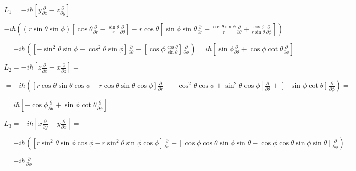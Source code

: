 \begin{equation}
  \begin{array}{c}
    L_1 = -i\hbar\left[y\frac{\partial}{\partial z}-z\frac{\partial}{\partial y}\right] =
    \\

    \\
    -i\hbar\left((r\sin{\theta}\sin{\phi})\left[\cos{\theta}\frac{\partial}{\partial r} - \frac{\sin{\theta}}{r} \frac{\partial}{\partial \theta}\right]-r\cos{\theta}\left[\sin{\phi}\sin{\theta}\frac{\partial}{\partial r} + \frac{\cos{\theta}\sin{\phi}}{r} \frac{\partial}{\partial \theta} + \frac{\cos{\phi}}{r\sin{\theta}} \frac{\partial}{\partial \phi}\right]\right) =
    \\

    \\
    = -i\hbar\left(\left[-\sin^2\theta\sin\phi-\cos^2\theta\sin\phi\right]\frac{\partial}{\partial \theta}-\left[\cos\phi\frac{\cos\theta}{\sin\theta}\right]\frac{\partial}{\partial\phi}\right) = i\hbar\left[\sin\phi\frac{\partial}{\partial\theta}+\cos\phi\cot\theta\frac{\partial}{\partial\phi}\right]
    \\

    \\
    L_2 = -i\hbar\left[z\frac{\partial}{\partial x}-x\frac{\partial}{\partial z}\right] =
    \\

    \\
    = -i\hbar\left(\left[r\cos\theta\sin\theta\cos\phi-r\cos\theta\sin\theta\cos\phi\right]\frac{\partial}{\partial r} + \left[\cos^2\theta\cos\phi+\sin^2\theta\cos\phi\right]\frac{\partial}{\partial \theta}+\left[-\sin\phi\cot\theta\right]\frac{\partial}{\partial\phi}\right) =
    \\

    \\
    = i\hbar\left[-\cos\phi\frac{\partial}{\partial\theta}+\sin\phi\cot\theta\frac{\partial}{\partial\phi}\right]
    \\

    \\
    L_3 = -i\hbar\left[x\frac{\partial}{\partial y}-y\frac{\partial}{\partial x}\right] =
    \\

    \\
    = -i\hbar\left(\left[r\sin^2\theta\sin\phi\cos\phi-r\sin^2\theta\sin\phi\cos\phi\right]\frac{\partial}{\partial r} + \left[\cos\phi\cos\theta\sin\phi\sin\theta-\cos\phi\cos\theta\sin\phi\sin\theta\right]\frac{\partial}{\partial\phi}\right) =
    \\

    \\
    = -i\hbar\frac{\partial}{\partial \phi}
  \end{array}
\end{equation}

